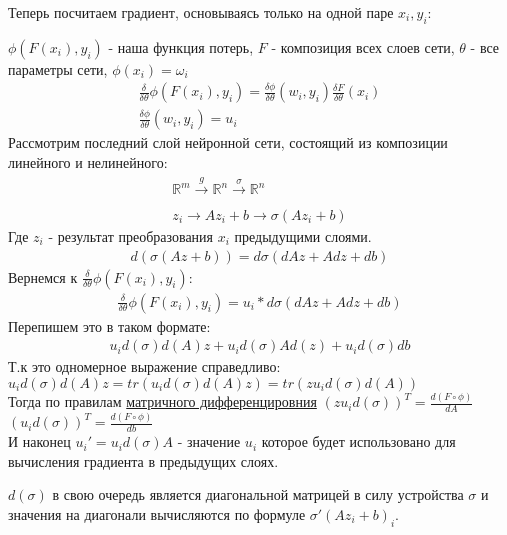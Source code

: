 \documentclass{article}
\newcommand{\R}{\mathbb{R}}
\begin{document}
Теперь посчитаем градиент, основываясь только на одной паре 
$x_i, y_i$:

$\phi(F(x_i), y_i)$ - наша функция потерь, $F$ - композиция всех слоев сети,
$\theta$ - все параметры сети, $\phi(x_i) = \omega_i$
\begin{align*}
    \frac{\delta}{\delta \theta}\phi(F(x_i), y_i) =
    \frac{\delta \phi}{\delta \theta} (w_i, y_i) \frac{\delta F}{\delta \theta} (x_i)\\
    \frac{\delta \phi}{\delta \theta} (w_i, y_i) = u_i 
\end{align*}
Рассмотрим последний слой нейронной сети, состоящий из композиции линейного и нелинейного:
\begin{align*}
    \R^m \xrightarrow[]{g} \R^n \xrightarrow[]{\sigma} \R^n\\
    z_i \to A z_i + b \to \sigma(A z_i + b)
\end{align*}
Где $z_i$ - результат преобразования $x_i$ предыдущими слоями.\\
\begin{align*}
    d(\sigma(Az + b)) = d\sigma(dA z + Adz + db)
\end{align*}
Вернемся к $\frac{\delta}{\delta \theta}\phi(F(x_i), y_i)$:\\
\begin{align*}
    \frac{\delta}{\delta \theta}\phi(F(x_i), y_i) = 
    u_i * d\sigma(dA z + Adz + db) 
\end{align*}
Перепишем это в таком формате:\\
\begin{align*}
    u_i d(\sigma) d(A) z + u_i d(\sigma)A d(z) + 
    u_i d(\sigma) db
\end{align*}
Т.к это одномерное выражение справедливо:\\
$u_i d(\sigma) d(A) z = tr(u_i d(\sigma) d(A) z) = 
tr(z u_i d(\sigma) d(A))$\\
Тогда по правилам \href{https://academy.yandex.ru/handbook/ml/article/matrichnoe-differencirovanie}{матричного дифференцировния}
$(z u_i d(\sigma))^T = \frac{d(F\circ \phi)}{dA}$\\
$(u_i d(\sigma))^T = \frac{d(F\circ \phi)}{db}$\\
И наконец $u_i' =u_i d(\sigma)A$ - значение $u_i$ которое будет использовано 
для вычисления градиента в предыдущих слоях.

$d(\sigma)$ в свою очередь является диагональной матрицей в силу устройства 
$\sigma$ и значения на диагонали вычисляются по формуле
$\sigma'(A z_i + b)_i$.
\end{document}
